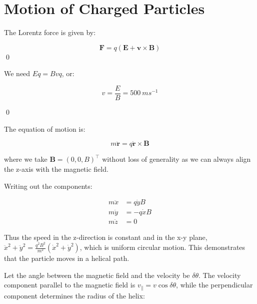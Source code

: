 \documentclass[12pt]{article}
\begin{document}



\pagebreak
\section*{Motion of Charged Particles}


The Lorentz force is given by:

\begin{equation}
    \mathbf{F} = q \left( \mathbf{E} + \mathbf{v} \times \mathbf{B} \right)
\end{equation}
\qed




We need $Eq = Bvq$, or:

\begin{equation}
    v = \frac{E}{B} = \qty{500}{ms^{-1}}
\end{equation}

\qed



The equation of motion is:

\begin{equation}
    m \ddot{\mathbf{r}} = q \dot{\mathbf{r}} \times \mathbf{B}
\end{equation}

where we take $\mathbf{B} = (0, 0, B)^{\intercal}$ without loss of generality as we can always align the z-axis with the magnetic field.

Writing out the components:

\begin{equation}
\begin{split}
    m \ddot{x} &= q \dot{y} B \\
    m \ddot{y} &= -q \dot{x} B \\
    m \ddot{z} &= 0
\end{split}
\end{equation}

Thus the speed in the z-direction is constant and in the x-y plane, $\ddot{x}^{2} + \ddot{y}^{2} = \frac{q^{2}B^{2}}{m^{2}} (\dot{x}^{2} + \dot{y}^{2})$, which is uniform circular motion. This demonstrates that the particle moves in a helical path.

Let the angle between the magnetic field and the velocity be $\delta \theta$. The velocity component parallel to the magnetic field is $v_{\parallel} = v \cos{\delta \theta}$, while the perpendicular component determines the radius of the helix:
\end{document}
